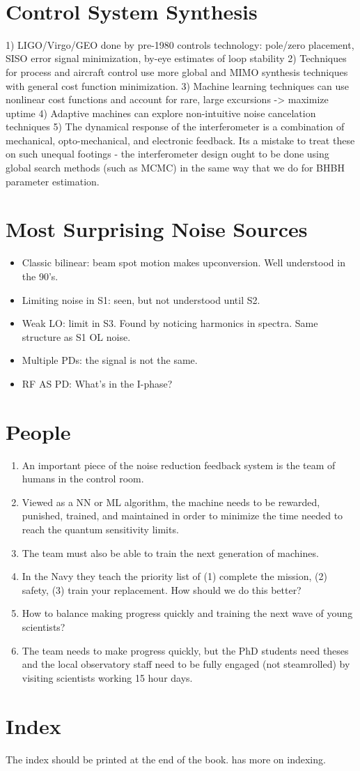 ​\section{Control System Synthesis}
  1) LIGO/Virgo/GEO done by pre-1980 controls technology: pole/zero placement, SISO error signal minimization, by-eye estimates of loop stability
  2) Techniques for process and aircraft control use more global and MIMO synthesis techniques with general cost function minimization.
  3) Machine learning techniques can use nonlinear cost functions and account for rare, large excursions -> maximize uptime
  4) Adaptive machines can explore non-intuitive noise cancelation techniques​
  5) The dynamical response of the interferometer is a combination of mechanical, opto-mechanical, and electronic feedback. Its a mistake to treat these on such unequal footings - the interferometer design ought to be done using global search methods (such as MCMC) in the same way that we do for BHBH parameter estimation.

\section{Most Surprising Noise Sources}
\begin{itemize}
\item Classic bilinear: beam spot motion makes upconversion. Well understood in the 90's.
\item Limiting noise in S1: seen, but not understood until S2.
\item Weak LO: limit in S3. Found by noticing harmonics in spectra. Same structure as S1 OL noise.
\item Multiple PDs: the signal is not the same.
\item RF AS PD: What's in the I-phase?

\end{itemize}

\section{People}
\begin{enumerate}
\item An important piece of the noise reduction feedback system is the team of humans 
  in the control room.
\item Viewed as a NN or ML algorithm, the machine needs to be rewarded, punished, trained, and 
  maintained in order to minimize the time needed to reach the quantum sensitivity limits.
\item The team must also be able to train the next generation of machines.
\item In the Navy they teach the priority list of (1) complete the mission, 
  (2) safety, (3) train your replacement. How should we do this better?
\item How to balance making progress quickly and training the next wave of young scientists?
\item The team needs to make progress quickly, but the PhD students need theses and the local
  observatory staff need to be fully engaged (not steamrolled) by visiting scientists working 15 hour days.
\end{enumerate}


\section{Index}
The index should be printed at the end of the book.  has more
on indexing.

